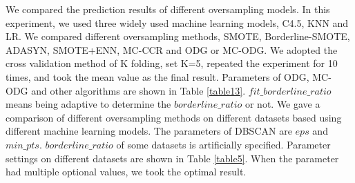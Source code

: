\documentclass[ida]{iosart2x}
\begin{document}
We compared the prediction results of different oversampling models.
In this experiment, we used three widely used machine learning models, C4.5, KNN and LR.
We compared different oversampling methods, SMOTE, Borderline-SMOTE, ADASYN, SMOTE+ENN, MC-CCR 
and ODG or MC-ODG.
We adopted the cross validation method of K folding, 
set K=5, repeated the experiment for 10 times, 
and took the mean value as the final result.
Parameters of ODG, MC-ODG and other algorithms are shown in Table \ref{table13}.
$fit\_borderline\_ratio$ means being 
adaptive to determine the $borderline\_ratio$ or not.
We gave a comparison of different oversampling methods on different 
datasets based using different machine learning models.  
The parameters of DBSCAN are $eps$ and $min\_pts$.
$borderline\_ratio$ of some datasets is artificially specified.
Parameter settings on different datasets are shown in Table \ref{table5}.
When the parameter had multiple optional values, we took the optimal result.
\end{document}
